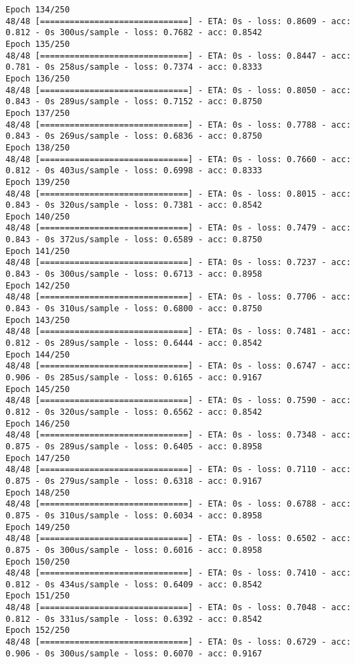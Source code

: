 \documentclass[11pt]{article}
\begin{document}
\begin{Verbatim}[commandchars=\\\{\}]
Epoch 134/250
48/48 [==============================] - ETA: 0s - loss: 0.8609 - acc: 0.812 - 0s 300us/sample - loss: 0.7682 - acc: 0.8542
Epoch 135/250
48/48 [==============================] - ETA: 0s - loss: 0.8447 - acc: 0.781 - 0s 258us/sample - loss: 0.7374 - acc: 0.8333
Epoch 136/250
48/48 [==============================] - ETA: 0s - loss: 0.8050 - acc: 0.843 - 0s 289us/sample - loss: 0.7152 - acc: 0.8750
Epoch 137/250
48/48 [==============================] - ETA: 0s - loss: 0.7788 - acc: 0.843 - 0s 269us/sample - loss: 0.6836 - acc: 0.8750
Epoch 138/250
48/48 [==============================] - ETA: 0s - loss: 0.7660 - acc: 0.812 - 0s 403us/sample - loss: 0.6998 - acc: 0.8333
Epoch 139/250
48/48 [==============================] - ETA: 0s - loss: 0.8015 - acc: 0.843 - 0s 320us/sample - loss: 0.7381 - acc: 0.8542
Epoch 140/250
48/48 [==============================] - ETA: 0s - loss: 0.7479 - acc: 0.843 - 0s 372us/sample - loss: 0.6589 - acc: 0.8750
Epoch 141/250
48/48 [==============================] - ETA: 0s - loss: 0.7237 - acc: 0.843 - 0s 300us/sample - loss: 0.6713 - acc: 0.8958
Epoch 142/250
48/48 [==============================] - ETA: 0s - loss: 0.7706 - acc: 0.843 - 0s 310us/sample - loss: 0.6800 - acc: 0.8750
Epoch 143/250
48/48 [==============================] - ETA: 0s - loss: 0.7481 - acc: 0.812 - 0s 289us/sample - loss: 0.6444 - acc: 0.8542
Epoch 144/250
48/48 [==============================] - ETA: 0s - loss: 0.6747 - acc: 0.906 - 0s 285us/sample - loss: 0.6165 - acc: 0.9167
Epoch 145/250
48/48 [==============================] - ETA: 0s - loss: 0.7590 - acc: 0.812 - 0s 320us/sample - loss: 0.6562 - acc: 0.8542
Epoch 146/250
48/48 [==============================] - ETA: 0s - loss: 0.7348 - acc: 0.875 - 0s 289us/sample - loss: 0.6405 - acc: 0.8958
Epoch 147/250
48/48 [==============================] - ETA: 0s - loss: 0.7110 - acc: 0.875 - 0s 279us/sample - loss: 0.6318 - acc: 0.9167
Epoch 148/250
48/48 [==============================] - ETA: 0s - loss: 0.6788 - acc: 0.875 - 0s 310us/sample - loss: 0.6034 - acc: 0.8958
Epoch 149/250
48/48 [==============================] - ETA: 0s - loss: 0.6502 - acc: 0.875 - 0s 300us/sample - loss: 0.6016 - acc: 0.8958
Epoch 150/250
48/48 [==============================] - ETA: 0s - loss: 0.7410 - acc: 0.812 - 0s 434us/sample - loss: 0.6409 - acc: 0.8542
Epoch 151/250
48/48 [==============================] - ETA: 0s - loss: 0.7048 - acc: 0.812 - 0s 331us/sample - loss: 0.6392 - acc: 0.8542
Epoch 152/250
48/48 [==============================] - ETA: 0s - loss: 0.6729 - acc: 0.906 - 0s 300us/sample - loss: 0.6070 - acc: 0.9167

\end{Verbatim}
\end{document}
